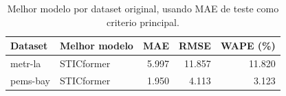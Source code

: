 \begin{table}[ht]
\centering
\caption{Melhor modelo por dataset original, usando MAE de teste como criterio principal.}
\label{tab:best-models-original}
\begin{tabular}{llrrr}
\toprule
Dataset & Melhor modelo & MAE & RMSE & WAPE (\%) \\
\midrule
metr-la & STICformer & 5.997 & 11.857 & 11.820 \\
pems-bay & STICformer & 1.950 & 4.113 & 3.123 \\
\bottomrule
\end{tabular}
\end{table}
